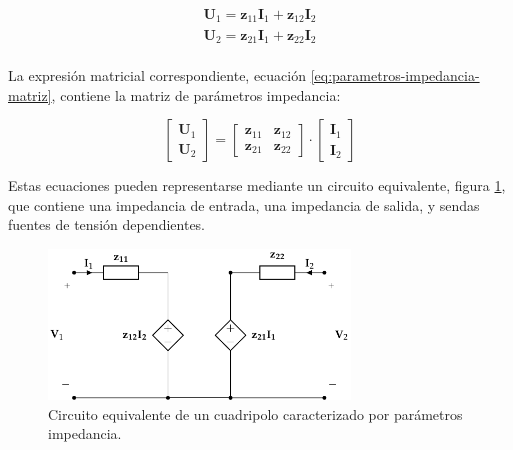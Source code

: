 \begin{equation}
  \label{eq:parametros-impedancia}
  \begin{array}{l}
    \mathbf{U}_1 = \mathbf{z}_{11} \mathbf{I}_1 + \mathbf{z}_{12} \mathbf{I}_2\\
    \mathbf{U}_2 = \mathbf{z}_{21} \mathbf{I}_1 + \mathbf{z}_{22} \mathbf{I}_2\\
  \end{array}
\end{equation}

La expresión matricial correspondiente, ecuación \ref{eq:parametros-impedancia-matriz}, contiene la matriz de parámetros impedancia:

\begin{equation}
  \label{eq:parametros-impedancia-matriz}
  \left[
    \begin{array}{c}
      \mathbf{U}_1\\
      \mathbf{U}_2
    \end{array}
  \right] =
  \left[
    \begin{array}{cc}
      \mathbf{z}_{11} & \mathbf{z}_{12}\\
      \mathbf{z}_{21} & \mathbf{z}_{22}
    \end{array}
  \right] \cdot
  \left[
    \begin{array}{c}
      \mathbf{I}_1\\
      \mathbf{I}_2
    \end{array}
  \right]
\end{equation}

Estas ecuaciones pueden representarse mediante un circuito equivalente, figura \ref{fig:circuito-equivalente-impedancia}, que contiene una impedancia de entrada, una impedancia de salida, y sendas fuentes de tensión dependientes.
\begin{figure}[H]
  \centering
  \includegraphics[height=4cm]{../figs/circuitoEquivalenteZ.pdf}
  \caption{Circuito equivalente de un cuadripolo caracterizado por parámetros impedancia.}
  \label{fig:circuito-equivalente-impedancia}
\end{figure}

